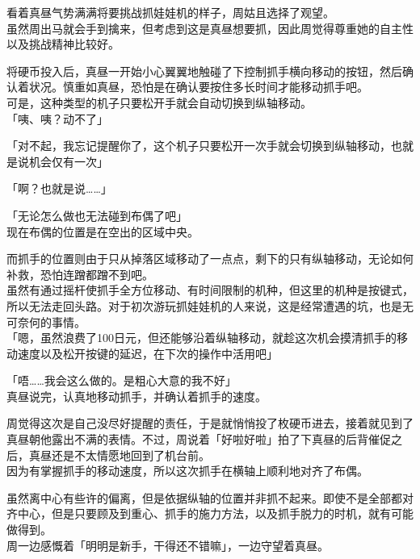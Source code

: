 看着真昼气势满满将要挑战抓娃娃机的样子，周姑且选择了观望。\\

虽然周出马就会手到擒来，但考虑到这是真昼想要抓，因此周觉得尊重她的自主性以及挑战精神比较好。

将硬币投入后，真昼一开始小心翼翼地触碰了下控制抓手横向移动的按钮，然后确认着状况。慎重如真昼，恐怕是在确认要按住多长时间才能移动抓手吧。\\

可是，这种类型的机子只要松开手就会自动切换到纵轴移动。\\

「咦、咦？动不了」

「对不起，我忘记提醒你了，这个机子只要松开一次手就会切换到纵轴移动，也就是说机会仅有一次」

「啊？也就是说……」

「无论怎么做也无法碰到布偶了吧」\\

现在布偶的位置是在空出的区域中央。

而抓手的位置则由于只从掉落区域移动了一点点，剩下的只有纵轴移动，无论如何补救，恐怕连蹭都蹭不到吧。\\

虽然有通过摇杆使抓手全方位移动、有时间限制的机种，但这里的机种是按键式，所以无法走回头路。对于初次游玩抓娃娃机的人来说，这是经常遭遇的坑，也是无可奈何的事情。\\

「嗯，虽然浪费了100日元，但还能够沿着纵轴移动，就趁这次机会摸清抓手的移动速度以及松开按键的延迟，在下次的操作中活用吧」

「唔……我会这么做的。是粗心大意的我不好」\\

真昼说完，认真地移动抓手，并确认着抓手的速度。

周觉得这次是自己没尽好提醒的责任，于是就悄悄投了枚硬币进去，接着就见到了真昼朝他露出不满的表情。不过，周说着「好啦好啦」拍了下真昼的后背催促之后，真昼还是不太情愿地回到了机台前。\\

因为有掌握抓手的移动速度，所以这次抓手在横轴上顺利地对齐了布偶。

虽然离中心有些许的偏离，但是依据纵轴的位置并非抓不起来。即使不是全部都对齐中心，但是只要顾及到重心、抓手的施力方法，以及抓手脱力的时机，就有可能做得到。\\

周一边感慨着「明明是新手，干得还不错嘛」，一边守望着真昼。\\

